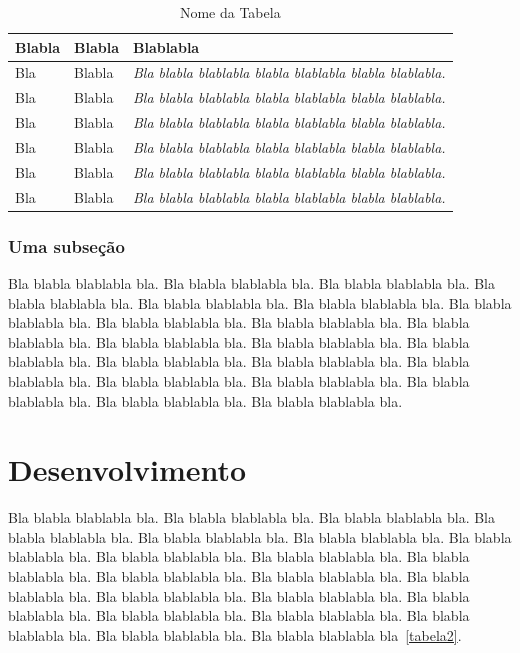 \documentclass[diss,capa]{texufpel}
\begin{document}
\begin{table}
  \begin{center}
    \caption{Nome da Tabela}\label{tabela}
    \begin{tabular}{p{4cm}p{5cm}p{6cm}}
      \hline
      Blabla & Blabla & Blablabla\\
      \hline
      {\small Bla} & {\small Blabla} & {\small\em Bla blabla blablabla blabla
        blablabla blabla blablabla.}\\
      {\small Bla} & {\small Blabla} & {\small\em Bla blabla blablabla blabla
        blablabla blabla blablabla.}\\
      {\small Bla} & {\small Blabla} & {\small\em Bla blabla blablabla blabla
        blablabla blabla blablabla.}\\
      {\small Bla} & {\small Blabla} & {\small\em Bla blabla blablabla blabla
        blablabla blabla blablabla.}\\
      {\small Bla} & {\small Blabla} & {\small\em Bla blabla blablabla blabla
        blablabla blabla blablabla.}\\
      {\small Bla} & {\small Blabla} & {\small\em Bla blabla blablabla blabla
        blablabla blabla blablabla.}\\
      \hline
    \end{tabular}
  \end{center}
\end{table}

\subsection{Uma subseção}

Bla blabla blablabla bla.  Bla blabla blablabla bla.  Bla blabla
blablabla bla.  Bla blabla blablabla bla.  Bla blabla blablabla bla.
Bla blabla blablabla bla.  Bla blabla blablabla bla.  Bla blabla
blablabla bla.  Bla blabla blablabla bla.  Bla blabla blablabla bla.
Bla blabla blablabla bla.  Bla blabla blablabla bla.  Bla blabla
blablabla bla.  Bla blabla blablabla bla.  Bla blabla blablabla bla.
Bla blabla blablabla bla.  Bla blabla blablabla bla.  Bla blabla
blablabla bla.  Bla blabla blablabla bla.  Bla blabla blablabla bla.
Bla blabla blablabla bla.

\chapter{Desenvolvimento}

  Bla blabla blablabla bla.  Bla blabla blablabla bla.  Bla blabla
  blablabla bla.  Bla blabla blablabla bla.  Bla blabla blablabla bla.
  Bla blabla blablabla bla.  Bla blabla blablabla bla.  Bla blabla
  blablabla bla.  Bla blabla blablabla bla.  Bla blabla blablabla bla.
  Bla blabla blablabla bla.  Bla blabla blablabla bla.  Bla blabla
  blablabla bla.  Bla blabla blablabla bla.  Bla blabla blablabla bla.
  Bla blabla blablabla bla.  Bla blabla blablabla bla.  Bla blabla
  blablabla bla.  Bla blabla blablabla bla.  Bla blabla blablabla bla.
  Bla blabla blablabla bla~\ref{tabela2}.
\end{document}

